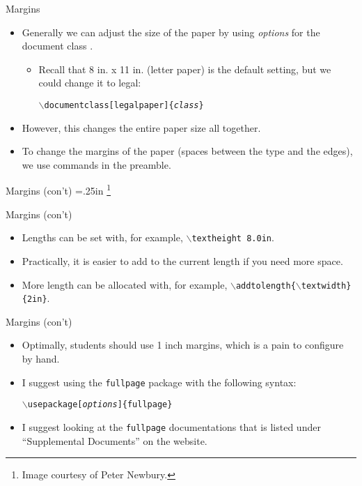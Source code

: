\documentclass[pdf]{prosper}
\begin{document}
\begin{slide}{Margins}
	\begin{itemize}
		\item Generally we can adjust the size of the paper by using \textit{options} for the document class .
			\begin{itemize}
				\item Recall that 8 in. x 11 in. (letter paper) is the default setting, but we could change it to legal:
					\begin{center}
						\texttt{$\backslash$documentclass[legalpaper]\{\textit{class}\}}
					\end{center}
			\end{itemize}
		\item However, this changes the entire paper size all together.
		\item To change the margins of the paper (spaces between the type and the edges), we use commands in the preamble.
	\end{itemize}
\end{slide}
\begin{slide}{Margins (con't)}
\parindent=.25in \footnote{Image courtesy of Peter Newbury.}
\end{slide}
\begin{slide}{Margins (con't)}
\begin{itemize}
	\item Lengths can be set with, for example, \texttt{$\backslash$textheight 8.0in}.
	\item Practically, it is easier to add to the current length if you need more space.
	\item More length can be allocated with, for example, \texttt{$\backslash$addtolength\{$\backslash$textwidth\}\{2in\}}.
\end{itemize}
\end{slide}
\begin{slide}{Margins (con't)}
	\begin{itemize}
		\item Optimally, students should use 1 inch margins, which is a pain to configure by hand.
		\item I suggest using the \texttt{fullpage} package with the following syntax:
			\begin{center}
				\texttt{$\backslash$usepackage[\textit{options}]\{fullpage\}}
			\end{center}
		\item I suggest looking at the \texttt{fullpage} documentations that is listed under ``Supplemental Documents'' on the website.
	\end{itemize}
\end{slide}
\end{document}
